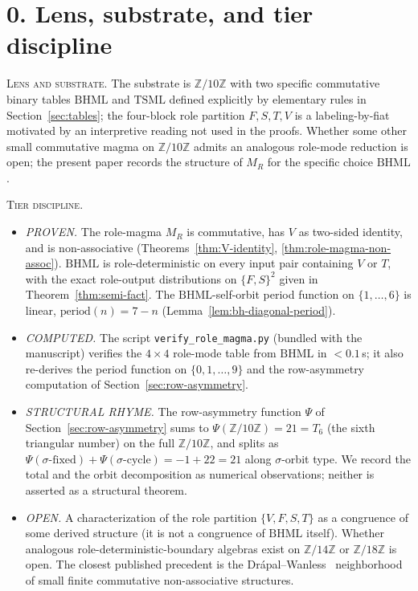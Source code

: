 \documentclass[11pt,reqno]{amsart}
\theoremstyle{plain}
\theoremstyle{definition}
\theoremstyle{remark}
\newcommand{\Z}{\mathbb{Z}}
\newcommand{\TS}{\mathrm{TSML}}
\newcommand{\BH}{\mathrm{BHML}}
\newcommand{\sig}{\sigma}
\newcommand{\Zten}{\Z/10\Z}
\begin{document}
\section*{0. Lens, substrate, and tier discipline}

\noindent
\textsc{Lens and substrate.}
The substrate is $\Zten$ with two specific commutative binary
tables $\BH$ and $\TS$ defined explicitly by elementary rules in
Section~\ref{sec:tables}; the four-block role partition
$F, S, T, V$ is a labeling-by-fiat motivated by an interpretive
reading not used in the proofs. Whether some other small
commutative magma on $\Zten$ admits an analogous role-mode
reduction is open; the present paper records the structure of
$M_R$ for the specific choice $\BH$.

\medskip\noindent
\textsc{Tier discipline.}
\begin{itemize}\setlength\itemsep{2pt}
\item \emph{PROVEN.} The role-magma $M_R$ is commutative, has
$V$ as two-sided identity, and is non-associative
(Theorems~\ref{thm:V-identity}, \ref{thm:role-magma-non-assoc}).
$\BH$ is role-deterministic on every input pair containing $V$
or $T$, with the exact role-output distributions on
$\{F, S\}^2$ given in Theorem~\ref{thm:semi-fact}. The
$\BH$-self-orbit period function on $\{1, \ldots, 6\}$ is
linear, $\mathrm{period}(n) = 7 - n$
(Lemma~\ref{lem:bh-diagonal-period}).
\item \emph{COMPUTED.} The script
\texttt{verify\_role\_magma.py} (bundled with the manuscript)
verifies the $4 \times 4$ role-mode table from $\BH$ in
$<0.1$\,s; it also re-derives the period function
on $\{0, 1, \ldots, 9\}$ and the row-asymmetry computation
of Section~\ref{sec:row-asymmetry}.
\item \emph{STRUCTURAL RHYME.} The row-asymmetry function $\Psi$
of Section~\ref{sec:row-asymmetry} sums to $\Psi(\Zten) = 21
= T_6$ (the sixth triangular number) on the full $\Zten$, and
splits as $\Psi(\sig\text{-fixed}) + \Psi(\sig\text{-cycle}) =
-1 + 22 = 21$ along $\sig$-orbit type. We record the
total and the orbit decomposition as numerical observations;
neither is asserted as a structural theorem.
\item \emph{OPEN.} A characterization of the role partition
$\{V, F, S, T\}$ as a congruence of some derived structure
(it is not a congruence of $\BH$ itself). Whether
analogous role-deterministic-boundary algebras exist on
$\Z/14\Z$ or $\Z/18\Z$ is open. The closest published
precedent is the
Dr\'apal--Wanless~\cite{DrapalWanless2021} neighborhood
of small finite commutative non-associative structures.
\end{itemize}
\end{document}
